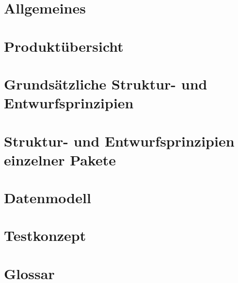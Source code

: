 \section{Allgemeines}

\section{Produktübersicht}

\section{Grundsätzliche Struktur- und Entwurfsprinzipien}

\section{Struktur- und Entwurfsprinzipien einzelner Pakete}

\section{Datenmodell}

\section{Testkonzept}

\section{Glossar}

